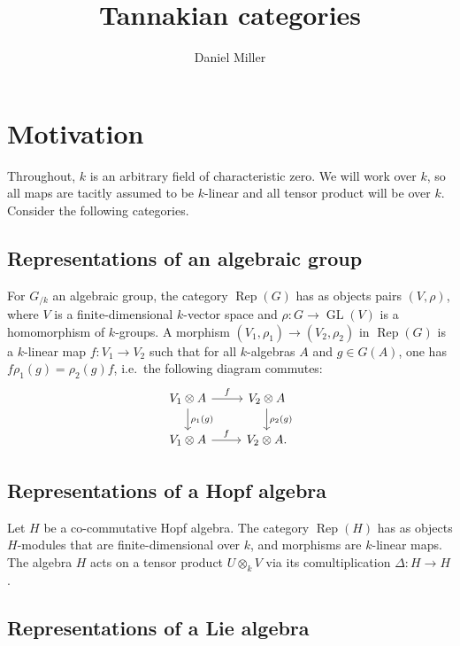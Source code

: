 \documentclass{article}
\title{Tannakian categories}
\author{Daniel Miller}
\DeclareMathOperator{\GL}{GL}
\DeclareMathOperator{\rep}{Rep}
\begin{document}
\maketitle





\section{Motivation}\label{sec:examples}

Throughout, $k$ is an arbitrary field of characteristic zero. We will work over 
$k$, so all maps are tacitly assumed to be $k$-linear and all tensor product 
will be over $k$. Consider the following categories. 


\subsection{Representations of an algebraic group}\label{sec:rep-gp}

For $G_{/k}$ an algebraic group, the category $\rep(G)$ has as objects pairs 
$(V,\rho)$, where $V$ is a finite-dimensional $k$-vector space and 
$\rho:G\to \GL(V)$ is a homomorphism of $k$-groups. A morphism 
$(V_1,\rho_1)\to (V_2,\rho_2)$ in $\rep(G)$ is a $k$-linear map 
$f:V_1\to V_2$ such that for all $k$-algebras $A$ and $g\in G(A)$, one has 
$f \rho_1(g) = \rho_2(g)  f$, i.e.~the following diagram commutes:
\[
\begin{tikzcd}
  V_1\otimes A \ar[r, "f"] \ar[d, "\rho_1(g)"] 
    & V_2\otimes A \ar[d, "\rho_2(g)"] \\
  V_1\otimes A \ar[r, "f"]
    & V_2\otimes A .
\end{tikzcd}
\]


\subsection{Representations of a Hopf algebra}\label{sec:rep-alg}

Let $H$ be a co-commutative Hopf algebra. The category $\rep(H)$ has as objects 
$H$-modules that are finite-dimensional over $k$, and morphisms are 
$k$-linear maps. The algebra $H$ acts on a tensor product $U\otimes_k V$ via 
its comultiplication $\Delta:H\to H$. 


\subsection{Representations of a Lie algebra}\label{sec:rep-liealg}
\end{document}
